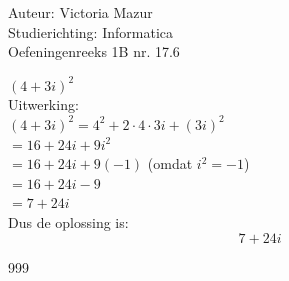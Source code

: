 \documentclass[a4paper]{article}
\begin{document}
  
\noindent \large Auteur: Victoria Mazur \\
\noindent \large Studierichting: Informatica\\
\noindent \large Oefeningenreeks 1B nr. 17.6\\

\medskip

\normalsize

$(4 + 3i)^2$\\

Uitwerking:\\

$(4 + 3i)^2 = 4^2 + 2 \cdot 4 \cdot 3i + (3i)^2$\\

$= 16 + 24i + 9i^2$\\

$= 16 + 24i + 9(-1)$ \quad (omdat $i^2 = -1$)\\

$= 16 + 24i - 9$\\

$= 7 + 24i$\\

Dus de oplossing is:\\
$$\boxed{7 + 24i}$$

\begin{thebibliography}{999}
\end{thebibliography}
\end{document}
